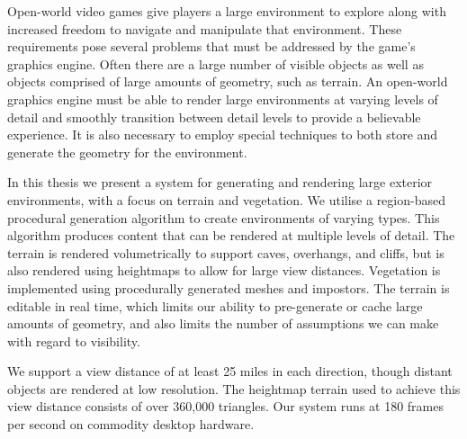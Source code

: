 Open-world video games give players a large environment to explore along with increased freedom to navigate and manipulate that environment.
These requirements pose several problems that must be addressed by the game’s graphics engine.
Often there are a large number of visible objects as well as objects comprised of large amounts of geometry, such as terrain.
An open-world graphics engine must be able to render large environments at varying levels of detail and smoothly transition between detail levels to provide a believable experience.
It is also necessary to employ special techniques to both store and generate the geometry for the environment.

In this thesis we present a system for generating and rendering large exterior environments, with a focus on terrain and vegetation.
We utilise a region-based procedural generation algorithm to create environments of varying types.
This algorithm produces content that can be rendered at multiple levels of detail.
The terrain is rendered volumetrically to support caves, overhangs, and cliffs, but is also rendered using heightmaps to allow for large view distances.
Vegetation is implemented using procedurally generated meshes and impostors.
The terrain is editable in real time, which limits our ability to pre-generate or cache large amounts of geometry, and also limits the number of assumptions we can make with regard to visibility.

We support a view distance of at least 25 miles in each direction, though distant objects are rendered at low resolution.
The heightmap terrain used to achieve this view distance consists of over 360,000 triangles.
Our system runs at 180 frames per second on commodity desktop hardware.
